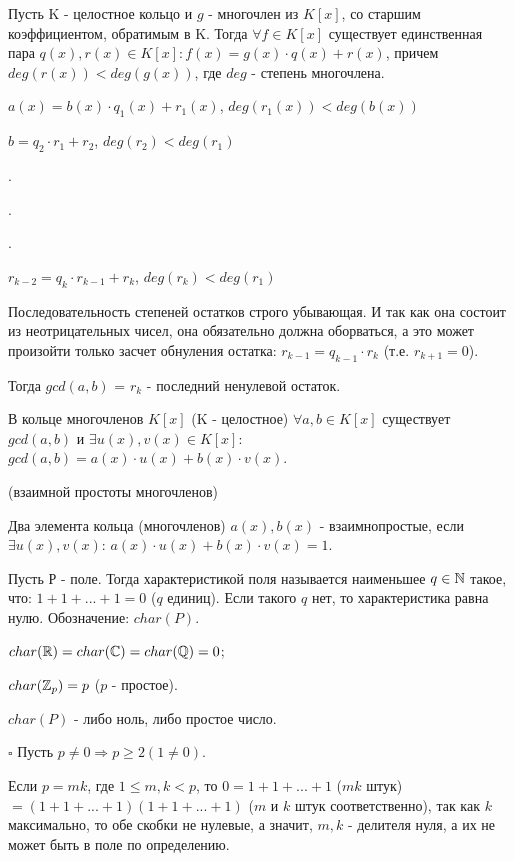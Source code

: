 \documentclass[../main.tex]{subfiles}
\begin{document}
    \void{} Пусть K - целостное кольцо и $g$ - многочлен из $K[x]$, со старшим
    коэффициентом, обратимым в K. Тогда $\forall f\in K[x]$ существует единственная пара 
    $q(x), r(x)\in K[x]: f(x) = g(x)\cdot q(x) + r(x)$, причем $deg(r(x)) < deg(g(x))$, где
    $deg$ - степень многочлена.

    \void{}

    $a(x) = b(x)\cdot q_1(x) + r_1(x)$, $deg(r_1(x)) < deg(b(x))$

    $b = q_2\cdot r_1 + r_2$, $deg(r_2) < deg(r_1)$

    .

    .

    .

    $r_{k-2} = q_k\cdot r_{k-1} + r_k$, $deg(r_k) < deg(r_1)$

    Последовательность степеней остатков строго убывающая. И так как она состоит
    из неотрицательных чисел, она обязательно должна оборваться, а это может произойти
    только засчет обнуления остатка: $r_{k-1} = q_{k-1}\cdot r_k$ (т.е. $r_{k+1} = 0$).

    Тогда $gcd(a, b)$ = $r_k$ - последний ненулевой остаток.

    \void{} В кольце многочленов $K[x]$ (K - целостное) $\forall a,b\in K[x]$ существует
    $gcd(a, b)$ и $\exists u(x),v(x)\in K[x]$: $gcd(a, b) = a(x)\cdot u(x) + b(x)\cdot v(x)$.

    \void{} (взаимной простоты многочленов)

    Два элемента кольца (многочленов) $a(x), b(x)$ - взаимнопростые, если 
    $\exists u(x),v(x)$: $a(x)\cdot u(x) + b(x)\cdot v(x) = 1$.

    \void{} Пусть Р - поле. Тогда характеристикой поля называется наименьшее
    $q\in\mathbb{N}$ такое, что: $1 + 1 + ... + 1 = 0$ ($q$ единиц). Если такого $q$ нет, то характеристика
    равна нулю. Обозначение: $char(P)$.

    \void{}

     $char(\mathbb{R}) = char(\mathbb{C}) = char(\mathbb{Q}) = 0$;

     $char(\mathbb{Z}_p) = p$ ($p$ - простое).

    \void{} $char(P)$ - либо ноль, либо простое число.

    \void
    $\square$ Пусть $p\neq 0 \Rightarrow p\geq 2 (1\neq 0)$.

    Если $p = mk$, где $1\leq m, k < p$, то $0 = 1+1+...+1$ ($mk$ штук)
    $= (1+1+...+1)(1+1+...+1)$ ($m$ и $k$ штук соответственно), так как $k$
    максимально, то обе скобки не нулевые, а значит, $m, k$ - делителя нуля, а их 
    не может быть в поле по определению.
\end{document}
